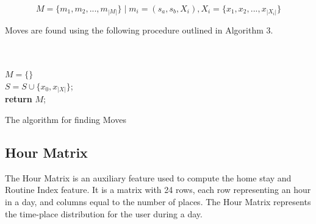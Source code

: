 \begin{equation}
\label{eq:feature-moves}
M = \{m_1, m_2, ..., m_{|M|}\} \;| \; m_i = (s_a, s_b, X_i), X_i = \{x_1, x_2, ..., x_{|X_i|}\}
\end{equation}

Moves are found using the following procedure outlined in Algorithm 3.

\begin{algorithm}[H]
\SetAlgoLined
{}\\
\\
    $M = \{ \}$\;\\
    $S = S \cup \{x_0, x_|X|\}$;\\
    \textbf{return} $M$;
 \label{algo:moves}
 \caption{The algorithm for finding Moves}
\end{algorithm}


\subsection{Hour Matrix}
\label{sub:hour-matrix}
The Hour Matrix is an auxiliary feature used to compute the home stay and Routine Index feature. It is a matrix with 24 rows, each row representing an hour in a day, and columns equal to the number of places. The Hour Matrix represents the time-place distribution for the user during a day.

